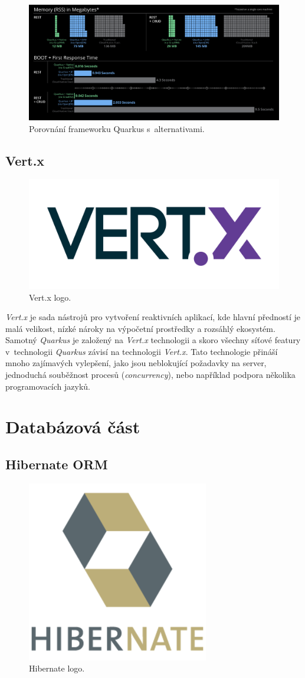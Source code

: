 \begin{figure}[hbt]
  \centering
  \includegraphics[width=1 \linewidth]{obrazky-figures/quarkus_stats.png}
  \caption{Porovnání frameworku Quarkus s~alternativami.~\cite{quarkus:website}}
  \label{figure:quarkus_stats}
\end{figure}

\newpage
\subsection*{Vert.x}
\label{pouzite:vertx}
\begin{figure}[hbt]
  \centering
  \includegraphics[width=.30 \linewidth]{obrazky-figures/vertx.png}
  \caption{Vert.x logo.~\cite{wiki:vertx}}
\end{figure}

\emph{Vert.x} je sada nástrojů pro vytvoření reaktivních aplikací, kde hlavní předností je malá velikost, nízké nároky na výpočetní prostředky a rozsáhlý ekosystém.
Samotný \emph{Quarkus} je založený na \emph{Vert.x} technologii a skoro všechny síťové featury v~technologii \emph{Quarkus} závisí na technologii \emph{Vert.x}.
Tato technologie přináší mnoho zajímavých vylepšení, jako jsou neblokující požadavky na server, jednoduchá souběžnost procesů (\emph{concurrency}), nebo například podpora několika programovacích jazyků.~\cite{wiki:vertx}

\section{Databázová část}
\label{pouzite:db}

\subsection*{Hibernate ORM}
\label{app_prostredi:hibernate}
\begin{figure}[hbt]
  \centering
  \includegraphics[width=.2 \linewidth]{obrazky-figures/hibernate.png}
  \caption{Hibernate logo.~\cite{hibernate:logo}}
\end{figure}

